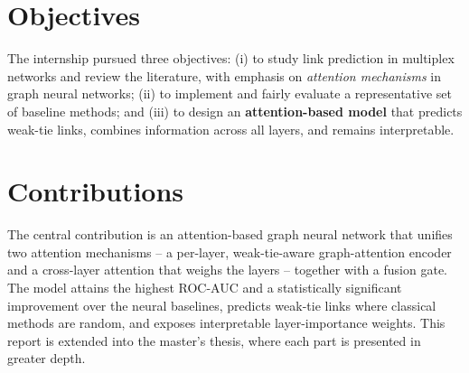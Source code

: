 \section{Objectives}
The internship pursued three objectives: (i) to study link prediction in multiplex networks and
review the literature, with emphasis on \emph{attention mechanisms} in graph neural networks; (ii)
to implement and fairly evaluate a representative set of baseline methods; and (iii) to design an
\textbf{attention-based model} that predicts weak-tie links, combines information across all layers,
and remains interpretable.

\section{Contributions}
The central contribution is an attention-based graph neural network that unifies two attention
mechanisms -- a per-layer, weak-tie-aware graph-attention encoder and a cross-layer attention that
weighs the layers -- together with a fusion gate. The model attains the highest ROC-AUC and a
statistically significant improvement over the neural baselines, predicts weak-tie links where
classical methods are random, and exposes interpretable layer-importance weights. This report is
extended into the master's thesis, where each part is presented in greater depth.
